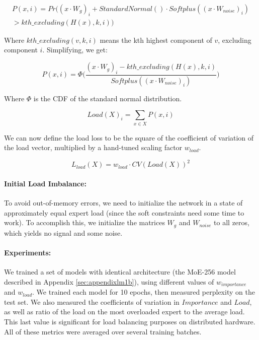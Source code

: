 \documentclass{article}
\begin{document}
\begin{equation}
\begin{aligned}
P(x, i) = Pr\Big( (x \cdot W_g)_i + StandardNormal() \cdot Softplus((x \cdot W_{noise})_i) \\ > kth\_excluding(H(x), k, i)\Big)
\end{aligned}
\end{equation}

Where $kth\_excluding(v, k, i)$ means the kth highest component of $v$, excluding component $i$.  Simplifying, we get:

\begin{equation}
    P(x, i) = \Phi\Big(\frac{(x \cdot W_g)_i - kth\_excluding(H(x), k, i)}{Softplus((x \cdot W_{noise})_i)}\Big)
\end{equation}

Where $\Phi$ is the CDF of the standard normal distribution.

\begin{equation}
    Load(X)_i = \sum_{x \in X}P(x, i) 
\end{equation}

We can now define the load loss to be the square of the coefficient of variation of the load vector, multiplied by a hand-tuned scaling factor $w_{load}$.

\begin{equation}\label{eq:loadloss}
L_{load}(X) = w_{load} \cdot CV(Load(X))^2
\end{equation}

\paragraph{Initial Load Imbalance:}  To avoid out-of-memory errors, we need to initialize the network in a state of approximately equal expert load (since the soft constraints need some time to work).  To accomplish this, we initialize the matrices $W_g$ and $W_{noise}$ to all zeros, which yields no signal and some noise.

\paragraph{Experiments:} We trained a set of models with identical architecture (the MoE-256 model described in Appendix \ref{sec:appendixlm1b}), using different values of $w_{importance}$ and $w_{load}$.  We trained each model for 10 epochs, then measured perplexity on the test set.  We also measured the coefficients of variation in $Importance$ and $Load$, as well as ratio of the load on the most overloaded expert to the average load.  This last value is significant for load balancing purposes on distributed hardware.  All of these metrics were averaged over several training batches.
\end{document}
